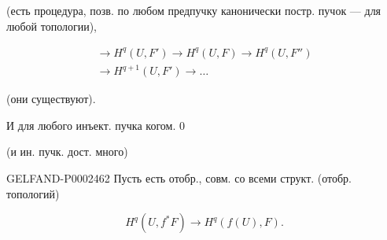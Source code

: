 (есть процедура, позв. по любом предпучку канонически постр. пучок — для любой топологии),



\begin{gather*}
\longrightarrow H^q(U,F')\longrightarrow H^q(U,F)\longrightarrow H^q(U,F'')\\
\longrightarrow H^{q+1}(U,F')\longrightarrow\ldots
\end{gather*}



(они существуют).



И для любого инъект. пучка когом. $0$



(и ин. пучк. дост. много)



\begin{GelfandAdjacentEvidence}{GELFAND-P000246}{2}
Пусть есть отобр., совм. со всеми структ. (отобр. топологий)




\end{GelfandAdjacentEvidence}

\begin{equation*}H^q(U,f^*F)\longrightarrow H^q(f(U),F).\end{equation*}



